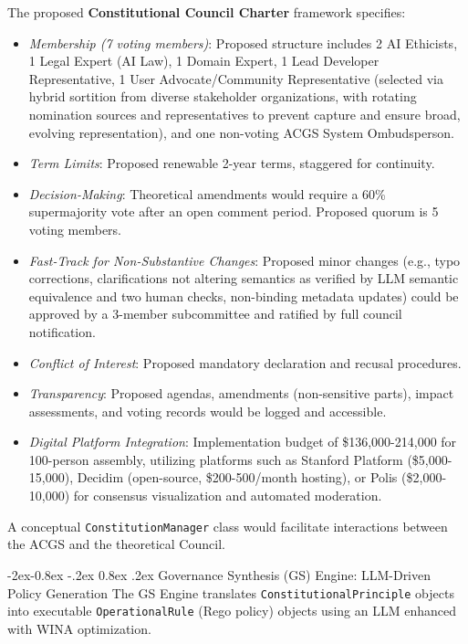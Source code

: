 \documentclass[manuscript,screen,9pt]{acmart}
\makeatletter
\renewcommand\subsubsection{\@startsection{subsubsection}{3}{\z@}%
  {-2ex\@plus -0.8ex \@minus -.2ex}%
  {0.8ex \@plus .2ex}%
  {\normalfont\normalsize\bfseries}}
\makeatother
\begin{document}
The proposed \textbf{Constitutional Council Charter} framework specifies:
\begin{itemize}[leftmargin=*,itemsep=1pt,parsep=1pt]
    \item \textit{Membership (7 voting members)}: Proposed structure includes 2 AI Ethicists, 1 Legal Expert (AI Law), 1 Domain Expert, 1 Lead Developer Representative, 1 User Advocate/Community Representative (selected via hybrid sortition from diverse stakeholder organizations, with rotating nomination sources and representatives to prevent capture and ensure broad, evolving representation), and one non-voting ACGS System Ombudsperson.
    \item \textit{Term Limits}: Proposed renewable 2-year terms, staggered for continuity.
    \item \textit{Decision-Making}: Theoretical amendments would require a 60\% supermajority vote after an open comment period. Proposed quorum is 5 voting members.
    \item \textit{Fast-Track for Non-Substantive Changes}: Proposed minor changes (e.g., typo corrections, clarifications not altering semantics as verified by LLM semantic equivalence and two human checks, non-binding metadata updates) could be approved by a 3-member subcommittee and ratified by full council notification.
    \item \textit{Conflict of Interest}: Proposed mandatory declaration and recusal procedures.
    \item \textit{Transparency}: Proposed agendas, amendments (non-sensitive parts), impact assessments, and voting records would be logged and accessible.
    \item \textit{Digital Platform Integration}: Implementation budget of \$136,000-214,000 for 100-person assembly, utilizing platforms such as Stanford Platform (\$5,000-15,000), Decidim (open-source, \$200-500/month hosting), or Polis (\$2,000-10,000) for consensus visualization and automated moderation.
\end{itemize}
A conceptual \texttt{ConstitutionManager} class would facilitate interactions between the ACGS and the theoretical Council.

\subsubsection{Governance Synthesis (GS) Engine: LLM-Driven Policy Generation}
\label{subsubsec:gs_engine_layer}
The GS Engine translates \texttt{ConstitutionalPrinciple} objects into executable \texttt{OperationalRule} (Rego policy) objects using an LLM enhanced with WINA optimization.
\end{document}
